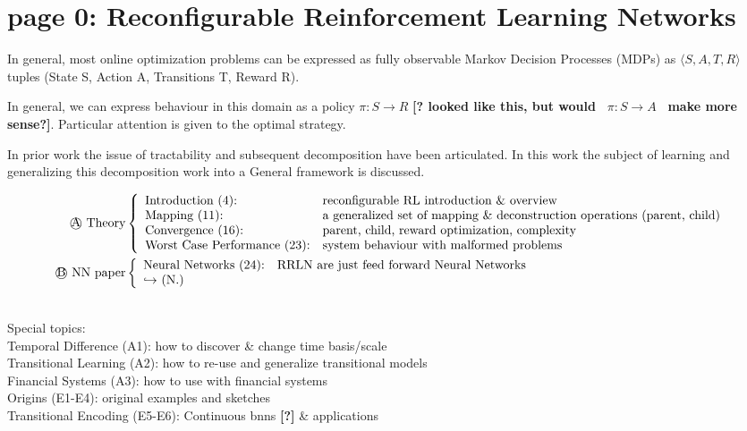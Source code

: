 

\section*{page 0: Reconfigurable Reinforcement Learning Networks}

In general, most online optimization problems can be expressed as fully observable Markov Decision Processes (MDPs)
as \( \langle S, A, T, R \rangle \) tuples (State S, Action A, Transitions T, Reward R).

In general, we can express behaviour in this domain as a policy \( \pi: S\rightarrow R\) {\textbf{[? looked like this, but would\ }}  \(\pi:S\rightarrow A \) 
{\textbf{\ make more sense?]}}. Particular attention is given to the optimal strategy.

In prior work the issue of tractability and subsequent decomposition have been articulated.  In this work the subject of learning
and generalizing this decomposition work into a General framework is discussed.

\begin{align*}
\text{\textcircled{A} Theory} & \left\{ 
\begin{array}{ll}
\text{Introduction (4):} & \text{reconfigurable RL introduction \& overview} \\
\text{Mapping (11):} & \text{a generalized set of mapping \& deconstruction operations (parent, child)} \\
\text{Convergence (16):} & \text{parent, child, reward optimization, complexity} \\
\text{Worst Case Performance (23):} & \text{system behaviour with malformed problems}
\end{array}
\right. \\
\text{\textcircled{B} NN paper} & \left\{ 
\begin{array}{ll}
\text{Neural Networks (24):} & \text{RRLN are just feed forward Neural Networks} \\
\text{\(\hookrightarrow\) (N.)} &  \text{\ }
\end{array}
\right.
\end{align*}

{\ }\\

Special topics:\\

 
\noindent\hspace*{1cm}Temporal Difference (A1): how to discover \& change time basis/scale\\
\hspace*{1cm}Transitional Learning (A2): how to re-use and generalize transitional models\\
\hspace*{1cm}Financial Systems (A3): how to use with financial systems\\
\hspace*{1cm}Origins (E1-E4): original examples and sketches\\
\hspace*{1cm}Transitional Encoding (E5-E6): Continuous bnns \textbf{[?]} \& applications
 

 
